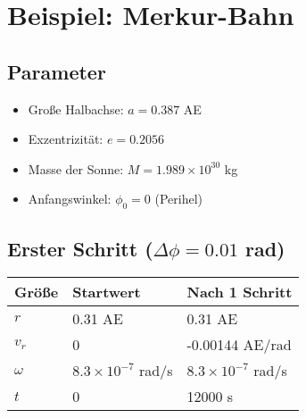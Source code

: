 \section{Beispiel: Merkur-Bahn}
\subsection{Parameter}
\begin{itemize}
\item Große Halbachse: $a = 0.387$ AE
\item Exzentrizität: $e = 0.2056$
\item Masse der Sonne: $M = 1.989 \times 10^{30}$ kg
\item Anfangswinkel: $\phi_0 = 0$ (Perihel)
\end{itemize}

\subsection{Erster Schritt ($\Delta\phi = 0.01$ rad)}
\begin{tabular}{|l|l|l|}
\hline
\textbf{Größe} & \textbf{Startwert} & \textbf{Nach 1 Schritt} \\ \hline
$r$ & 0.31 AE & 0.31 AE \\ \hline
$v_r$ & 0 & -0.00144 AE/rad \\ \hline
$\omega$ & $8.3 \times 10^{-7}$ rad/s & $8.3 \times 10^{-7}$ rad/s \\ \hline
$t$ & 0 & 12000 s \\ \hline
\end{tabular}